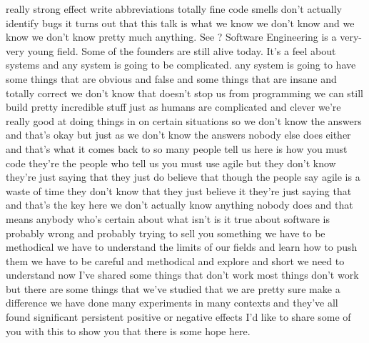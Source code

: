 \documentclass[conference, compsoc, twoside]{IEEEtran}
\begin{document}
really strong effect write abbreviations
totally fine code smells don't actually
identify bugs it turns out that this
talk is what we know we don't know and
we know we don't know pretty much anything. 
See ? Software Engineering is a very-very young field. 
Some of the founders are still alive today. 
It's a feel about systems and any system is going to be complicated. 
any system is going to have some things
that are obvious and false and some
things that are insane and totally
correct we don't know that doesn't stop
us from programming we can still build
pretty incredible stuff just as humans
are complicated and clever we're really
good at doing things in on certain
situations so we don't know the answers
and that's okay but just as we don't
know the answers nobody else does either
and that's what it comes back to so many
people tell us here is how you must code
they're the people who tell us you must
use agile but they don't know they're
just saying that they just do believe
that though the people say agile is a
waste of time they don't know that they
just believe it they're just saying that
and that's the key here we don't
actually know anything nobody does and
that means anybody who's certain about
what isn't is it true about software is
probably wrong and probably trying to
sell you something we have to be
methodical we have to understand the
limits of our fields and learn how to
push them we have to be careful and
methodical and explore and short we need
to understand now I've shared some
things that don't work most things don't
work but there are some things that
we've studied that we are pretty sure
make a difference we have done many
experiments in many contexts and they've
all found significant persistent
positive or negative effects I'd like to
share some of you with this to show you
that there is some hope here.
\end{document}
